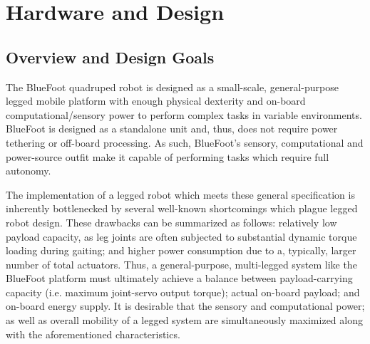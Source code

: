 
\chapter{Hardware and Design}
\label{ch::hardware_and_design}

	\section{Overview and Design Goals}
	
	The BlueFoot quadruped robot is designed as a small-scale, general-purpose legged mobile platform with enough physical dexterity and on-board computational/sensory power to perform complex tasks in variable environments. BlueFoot is designed as a standalone unit and, thus, does not require power tethering or off-board processing. As such, BlueFoot's sensory, computational and power-source outfit make it capable of performing tasks which require full autonomy.

	The implementation of a legged robot which meets these general specification is inherently bottlenecked by several well-known shortcomings which plague legged robot design. These drawbacks can be summarized as follows: relatively low payload capacity, as leg joints are often subjected to substantial dynamic torque loading during gaiting; and higher power consumption due to a, typically, larger number of total actuators. Thus, a general-purpose, multi-legged system like the BlueFoot platform must ultimately achieve a balance between payload-carrying capacity (i.e. maximum joint-servo output torque); actual on-board payload; and on-board energy supply. It is desirable that the sensory and computational power; as well as overall mobility of a legged system are simultaneously maximized along with the aforementioned characteristics. 
	

